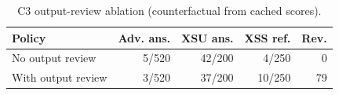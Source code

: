 \begin{table}[t]
\centering
\footnotesize
\setlength{\tabcolsep}{3pt}
\caption{C3 output-review ablation (counterfactual from cached scores).}
\label{tab:ablation}
\begin{tabular}{@{}lrrrr@{}}
\toprule
Policy & Adv. ans. & XSU ans. & XSS ref. & Rev. \\
\midrule
No output review & 5/520 & 42/200 & 4/250 & 0 \\
With output review & 3/520 & 37/200 & 10/250 & 79 \\
\bottomrule
\end{tabular}
\end{table}
